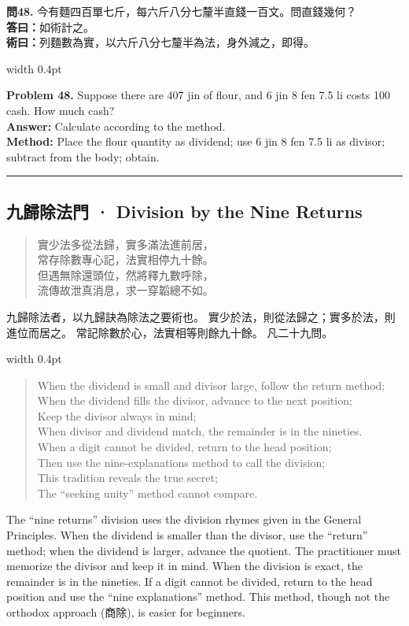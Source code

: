 \documentclass[10pt,a4paper]{article}
\newcommand{\longline}{\noindent\rule{\textwidth}{0.3pt}}
\newlength{\cnwidth}
\newlength{\enwidth}
\newcommand{\bilingual}[2]{%
  \noindent%
  \begin{minipage}[t]{\cnwidth}%
    #1%
  \end{minipage}%
  \hfill\vrule width 0.4pt\hfill%
  \begin{minipage}[t]{\enwidth}%
    #2%
  \end{minipage}%
  \par\smallskip%
}
\newcommand{\bilingualsubsection}[2]{%
  \subsection*{#1 · #2}
}
\newenvironment{rhymecn}{%
  \begin{quote}\itshape\color{verselinecolor}
}{\end{quote}}
\begin{document}
\bilingual{%
  \textbf{問48.}
  今有麵四百單七斤，每六斤八分七釐半直錢一百文。問直錢幾何？\\
  \textbf{答曰：}如術計之。\\
  \textbf{術曰：}列麵數為實，以六斤八分七釐半為法，身外減之，即得。
}{%
  \textbf{Problem 48.}
  Suppose there are 407 jin of flour, and 6 jin 8 fen 7.5 li costs 100 cash.
  How much cash?\\
  \textbf{Answer:} Calculate according to the method.\\
  \textbf{Method:} Place the flour quantity as dividend; use 6 jin 8 fen 7.5 li as
  divisor; subtract from the body; obtain.
}

\longline


\bilingualsubsection{九歸除法門}{Division by the Nine Returns}
\label{sec:jiugui}

\bilingual{%
  \begin{rhymecn}
  實少法多從法歸，實多滿法進前居，\\
  常存除數專心記，法實相停九十餘。\\
  但遇無除還頭位，然將釋九數呼除，\\
  流傳故泄真消息，求一穿韜總不如。
  \end{rhymecn}
  九歸除法者，以九歸訣為除法之要術也。
  實少於法，則從法歸之；實多於法，則進位而居之。
  常記除數於心，法實相等則餘九十餘。
  凡二十九問。
}{%
  \begin{rhymecn}
  When the dividend is small and divisor large, follow the return method;\\
  When the dividend fills the divisor, advance to the next position;\\
  Keep the divisor always in mind;\\
  When divisor and dividend match, the remainder is in the nineties.\\
  When a digit cannot be divided, return to the head position;\\
  Then use the nine-explanations method to call the division;\\
  This tradition reveals the true secret;\\
  The ``seeking unity'' method cannot compare.
  \end{rhymecn}
  The ``nine returns'' division uses the division rhymes given in the
  General Principles. When the dividend is smaller than the divisor, use the
  ``return'' method; when the dividend is larger, advance the quotient. The
  practitioner must memorize the divisor and keep it in mind. When the division
  is exact, the remainder is in the nineties. If a digit cannot be divided,
  return to the head position and use the ``nine explanations'' method. This
  method, though not the orthodox approach (商除), is easier for beginners.
}
\end{document}

